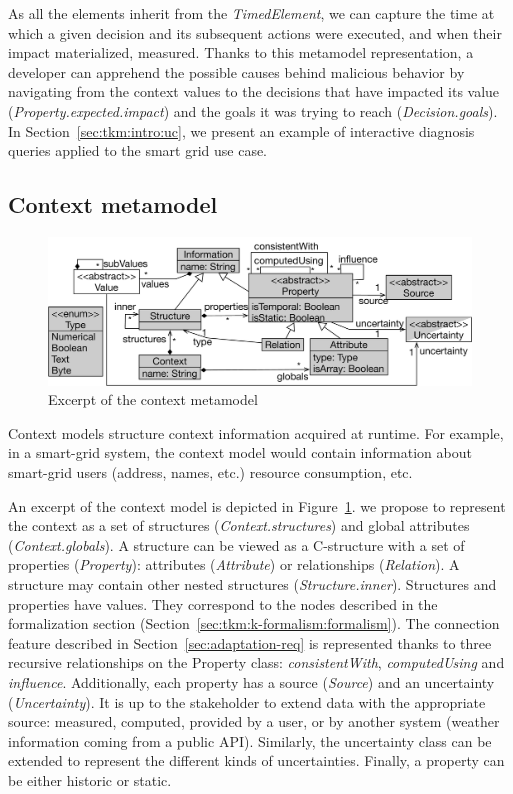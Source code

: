 As all the elements inherit from the \textit{TimedElement}, we can capture the time at which a given decision and its subsequent actions were executed, and when their impact materialized, \ie measured.
Thanks to this metamodel representation, a developer can apprehend the possible causes behind malicious behavior by navigating from the context values to the decisions that have impacted its value (\textit{Property.expected.impact}) and the goals it was trying to reach (\textit{Decision.goals}).
In Section~\ref{sec:tkm:intro:uc}, we present an example of interactive diagnosis queries applied to the smart grid use case.

\subsection{Context metamodel}
\begin{figure}
  \begin{center}
      \includegraphics[width=.8\linewidth]{img/chapt-tkm/mm/contextModel}
      \caption{Excerpt of the context metamodel}
      \label{fig:context-model}
  \end{center}	
\end{figure}

Context models structure context information acquired at runtime. 
For example, in a smart-grid system, the context model would contain information about smart-grid users (address, names, etc.) resource consumption, etc.

An excerpt of the context model is depicted in Figure~\ref{fig:context-model}. 
we propose to represent the context as a set of structures (\textit{Context.structures}) and global attributes (\textit{Context.globals}).
A structure can be viewed as a C-structure with a set of properties (\textit{Property}): attributes (\textit{Attribute}) or relationships (\textit{Relation}).
A structure may contain other nested structures (\textit{Structure.inner}).
Structures and properties have values.
They correspond to the nodes described in the formalization section (\cf Section~\ref{sec:tkm:k-formalism:formalism}).
The connection feature described in Section~\ref{sec:adaptation-req} is represented thanks to three recursive relationships on the Property class: \textit{consistentWith}, \textit{computedUsing} and \textit{influence}.
Additionally, each property has a source (\textit{Source}) and an uncertainty (\textit{Uncertainty}).
It is up to the stakeholder to extend data with the appropriate source: measured, computed, provided by a user, or by another system (\eg weather information coming from a public API).
Similarly, the uncertainty class can be extended to represent the different kinds of uncertainties. Finally, a property can be either historic or static.

